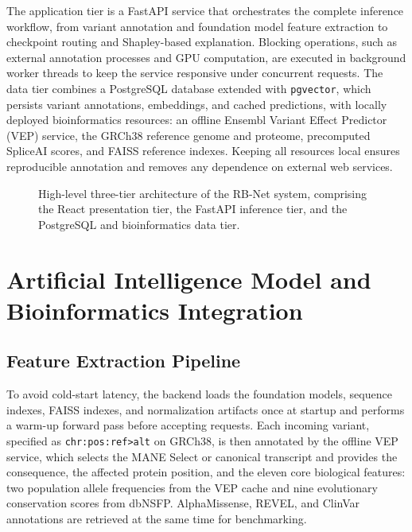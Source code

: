The application tier is a FastAPI service that orchestrates the complete inference workflow, from variant annotation and foundation model feature extraction to checkpoint routing and Shapley-based explanation. Blocking operations, such as external annotation processes and GPU computation, are executed in background worker threads to keep the service responsive under concurrent requests. The data tier combines a PostgreSQL database extended with \texttt{pgvector}, which persists variant annotations, embeddings, and cached predictions, with locally deployed bioinformatics resources: an offline Ensembl Variant Effect Predictor (VEP) service, the GRCh38 reference genome and proteome, precomputed SpliceAI scores, and FAISS reference indexes. Keeping all resources local ensures reproducible annotation and removes any dependence on external web services.

\begin{figure}[htbp]
    \centering
    \caption{High-level three-tier architecture of the RB-Net system, comprising the React presentation tier, the FastAPI inference tier, and the PostgreSQL and bioinformatics data tier.}
    \label{fig:system_architecture}
\end{figure}

\section{Artificial Intelligence Model and Bioinformatics Integration}
\label{sec:ai_integration}

\subsection{Feature Extraction Pipeline}

To avoid cold-start latency, the backend loads the foundation models, sequence indexes, FAISS indexes, and normalization artifacts once at startup and performs a warm-up forward pass before accepting requests. Each incoming variant, specified as \texttt{chr:pos:ref>alt} on GRCh38, is then annotated by the offline VEP service, which selects the MANE Select or canonical transcript and provides the consequence, the affected protein position, and the eleven core biological features: two population allele frequencies from the VEP cache and nine evolutionary conservation scores from dbNSFP. AlphaMissense, REVEL, and ClinVar annotations are retrieved at the same time for benchmarking.


